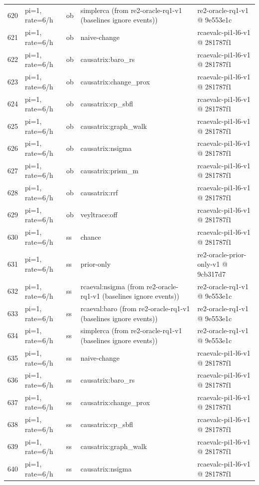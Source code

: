 \begin{longtable}{@{}r>{\raggedright\arraybackslash}p{48.0pt}>{\raggedright\arraybackslash}p{18.0pt}>{\raggedright\arraybackslash}p{108.0pt}>{\raggedright\arraybackslash}p{105.0pt}@{}}
620 & pi=1, rate=6/h & ob & simplerca (from re2-oracle-rq1-v1 (baselines ignore events)) & re2-oracle-rq1-v1 @ 9e553e1c \\
621 & pi=1, rate=6/h & ob & naive-change & rcaevalc-pi1-l6-v1 @ 281787f1 \\
622 & pi=1, rate=6/h & ob & causatrix:baro\_rs & rcaevalc-pi1-l6-v1 @ 281787f1 \\
623 & pi=1, rate=6/h & ob & causatrix:change\_prox & rcaevalc-pi1-l6-v1 @ 281787f1 \\
624 & pi=1, rate=6/h & ob & causatrix:cp\_sbfl & rcaevalc-pi1-l6-v1 @ 281787f1 \\
625 & pi=1, rate=6/h & ob & causatrix:graph\_walk & rcaevalc-pi1-l6-v1 @ 281787f1 \\
626 & pi=1, rate=6/h & ob & causatrix:nsigma & rcaevalc-pi1-l6-v1 @ 281787f1 \\
627 & pi=1, rate=6/h & ob & causatrix:prism\_m & rcaevalc-pi1-l6-v1 @ 281787f1 \\
628 & pi=1, rate=6/h & ob & causatrix:rrf & rcaevalc-pi1-l6-v1 @ 281787f1 \\
629 & pi=1, rate=6/h & ob & veyltrace:off & rcaevalc-pi1-l6-v1 @ 281787f1 \\
630 & pi=1, rate=6/h & ss & chance & rcaevalc-pi1-l6-v1 @ 281787f1 \\
631 & pi=1, rate=6/h & ss & prior-only & re2-oracle-prior-only-v1 @ 9cb317d7 \\
632 & pi=1, rate=6/h & ss & rcaeval:nsigma (from re2-oracle-rq1-v1 (baselines ignore events)) & re2-oracle-rq1-v1 @ 9e553e1c \\
633 & pi=1, rate=6/h & ss & rcaeval:baro (from re2-oracle-rq1-v1 (baselines ignore events)) & re2-oracle-rq1-v1 @ 9e553e1c \\
634 & pi=1, rate=6/h & ss & simplerca (from re2-oracle-rq1-v1 (baselines ignore events)) & re2-oracle-rq1-v1 @ 9e553e1c \\
635 & pi=1, rate=6/h & ss & naive-change & rcaevalc-pi1-l6-v1 @ 281787f1 \\
636 & pi=1, rate=6/h & ss & causatrix:baro\_rs & rcaevalc-pi1-l6-v1 @ 281787f1 \\
637 & pi=1, rate=6/h & ss & causatrix:change\_prox & rcaevalc-pi1-l6-v1 @ 281787f1 \\
638 & pi=1, rate=6/h & ss & causatrix:cp\_sbfl & rcaevalc-pi1-l6-v1 @ 281787f1 \\
639 & pi=1, rate=6/h & ss & causatrix:graph\_walk & rcaevalc-pi1-l6-v1 @ 281787f1 \\
640 & pi=1, rate=6/h & ss & causatrix:nsigma & rcaevalc-pi1-l6-v1 @ 281787f1 \\

\end{longtable}
